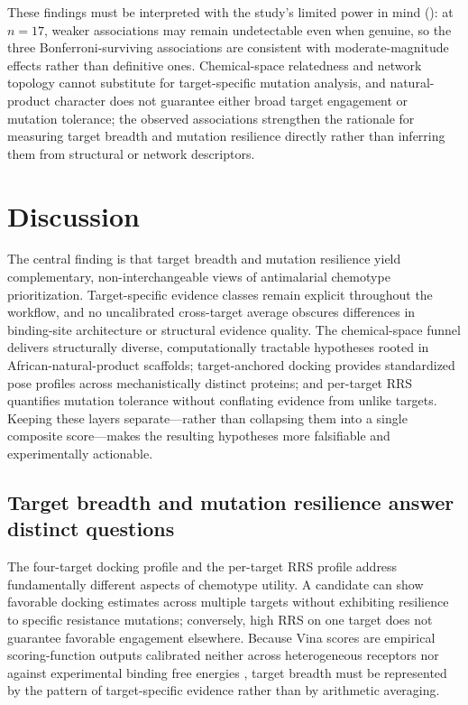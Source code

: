 \documentclass[journal=jcisd8,manuscript=article]{achemso}
\begin{document}
These findings must be interpreted with the study's limited power in mind (): at $n=\num{17}$, weaker associations may remain undetectable even when genuine, so the three Bonferroni-surviving associations are consistent with moderate-magnitude effects rather than definitive ones. Chemical-space relatedness and network topology cannot substitute for target-specific mutation analysis, and natural-product character does not guarantee either broad target engagement or mutation tolerance; the observed associations strengthen the rationale for measuring target breadth and mutation resilience directly rather than inferring them from structural or network descriptors.

\section{Discussion}\label{sec:discussion}
The central finding is that target breadth and mutation resilience yield complementary, non-interchangeable views of antimalarial chemotype prioritization. Target-specific evidence classes remain explicit throughout the workflow, and no uncalibrated cross-target average obscures differences in binding-site architecture or structural evidence quality. The chemical-space funnel delivers structurally diverse, computationally tractable hypotheses rooted in African-natural-product scaffolds; target-anchored docking provides standardized pose profiles across mechanistically distinct proteins; and per-target RRS quantifies mutation tolerance without conflating evidence from unlike targets. Keeping these layers separate—rather than collapsing them into a single composite score—makes the resulting hypotheses more falsifiable and experimentally actionable.

\subsection{Target breadth and mutation resilience answer distinct questions}\label{sec:disc_breadth}
The four-target docking profile and the per-target RRS profile address fundamentally different aspects of chemotype utility. A candidate can show favorable docking estimates across multiple targets without exhibiting resilience to specific resistance mutations; conversely, high RRS on one target does not guarantee favorable engagement elsewhere. Because Vina scores are empirical scoring-function outputs calibrated neither across heterogeneous receptors nor against experimental binding free energies \cite{Quiroga2016}, target breadth must be represented by the pattern of target-specific evidence rather than by arithmetic averaging.
\end{document}
